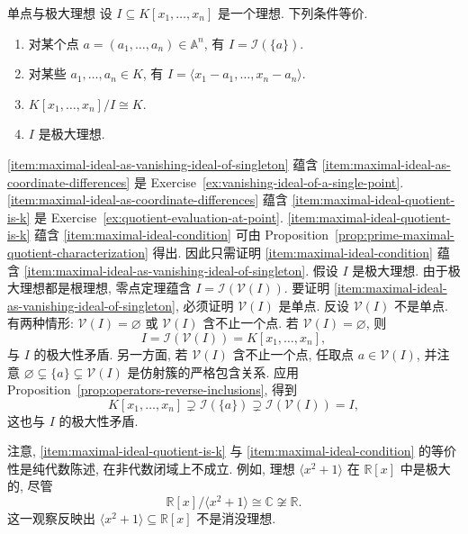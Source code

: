 \begin{Proposition}{单点与极大理想}\leavevmode\label{prop:single-points-and-maximal-ideals}
  设 $I\subseteq K[x_{1},\ldots,x_{n}]$ 是一个理想. 下列条件等价.
  \begin{enumerate}[label=(\roman*),ref=(\roman*)]
    \item\label{item:maximal-ideal-as-vanishing-ideal-of-singleton} 对某个点 $a=(a_{1},\ldots,a_{n})\in\mathbb{A}^{n}$, 有 $I=\mathcal{I}(\{a\})$.
    \item\label{item:maximal-ideal-as-coordinate-differences} 对某些 $a_{1},\ldots,a_{n}\in K$, 有 $I=\langle x_{1}-a_{1},\ldots,x_{n}-a_{n}\rangle$.
    \item\label{item:maximal-ideal-quotient-is-k} $K[x_{1},\ldots,x_{n}]/I\cong K$.
    \item\label{item:maximal-ideal-condition} $I$ 是极大理想.
  \end{enumerate}
\end{Proposition}

\begin{Proof}
  \ref{item:maximal-ideal-as-vanishing-ideal-of-singleton} 蕴含 \ref{item:maximal-ideal-as-coordinate-differences} 是 Exercise~\ref{ex:vanishing-ideal-of-a-single-point}. \ref{item:maximal-ideal-as-coordinate-differences} 蕴含 \ref{item:maximal-ideal-quotient-is-k} 是 Exercise~\ref{ex:quotient-evaluation-at-point}. \ref{item:maximal-ideal-quotient-is-k} 蕴含 \ref{item:maximal-ideal-condition} 可由 Proposition~\ref{prop:prime-maximal-quotient-characterization} 得出. 因此只需证明 \ref{item:maximal-ideal-condition} 蕴含 \ref{item:maximal-ideal-as-vanishing-ideal-of-singleton}. 假设 $I$ 是极大理想. 由于极大理想都是根理想, 零点定理蕴含 $I=\mathcal{I}(\mathcal{V}(I))$. 要证明 \ref{item:maximal-ideal-as-vanishing-ideal-of-singleton}, 必须证明 $\mathcal{V}(I)$ 是单点. 反设 $\mathcal{V}(I)$ 不是单点. 有两种情形: $\mathcal{V}(I)=\varnothing$ 或 $\mathcal{V}(I)$ 含不止一个点. 若 $\mathcal{V}(I)=\varnothing$, 则
  \[
    I=\mathcal{I}(\mathcal{V}(I))=K[x_{1},\ldots,x_{n}],
  \]
  与 $I$ 的极大性矛盾. 另一方面, 若 $\mathcal{V}(I)$ 含不止一个点, 任取点 $a\in\mathcal{V}(I)$, 并注意 $\varnothing\subsetneq\{a\}\subsetneq\mathcal{V}(I)$ 是仿射簇的严格包含关系. 应用 Proposition~\ref{prop:operators-reverse-inclusions}, 得到
  \[
    K[x_{1},\ldots,x_{n}]\supsetneq\mathcal{I}(\{a\})
      \supsetneq\mathcal{I}(\mathcal{V}(I))=I,
  \]
  这也与 $I$ 的极大性矛盾.
\end{Proof}

注意, \ref{item:maximal-ideal-quotient-is-k} 与 \ref{item:maximal-ideal-condition} 的等价性是纯代数陈述, 在非代数闭域上不成立. 例如, 理想 $\langle x^{2}+1\rangle$ 在 $\mathbb{R}[x]$ 中是极大的, 尽管
\[
  \mathbb{R}[x]/\langle x^{2}+1\rangle\cong\mathbb{C}\not\cong\mathbb{R}.
\]
这一观察反映出 $\langle x^{2}+1\rangle\subseteq\mathbb{R}[x]$ 不是消没理想.

